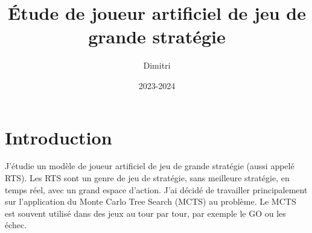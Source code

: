 \documentclass[a4paper, 11pt]{article}
\begin{document}
\title{Étude de joueur artificiel de jeu de grande stratégie}
\author{Dimitri }
\date{2023-2024}

\maketitle

\section*{Introduction}
J'étudie un modèle de joueur artificiel de jeu de grande stratégie (aussi appelé RTS).
Les RTS sont un genre de jeu de stratégie, sans meilleure stratégie, en temps réel, avec un grand espace d'action.
J'ai décidé de travailler principalement sur l'application du Monte Carlo Tree Search (MCTS) au problème.
Le MCTS est souvent utilisé dans des jeux au tour par tour, par exemple le GO ou les échec.


\nocite{*}

\end{document}
